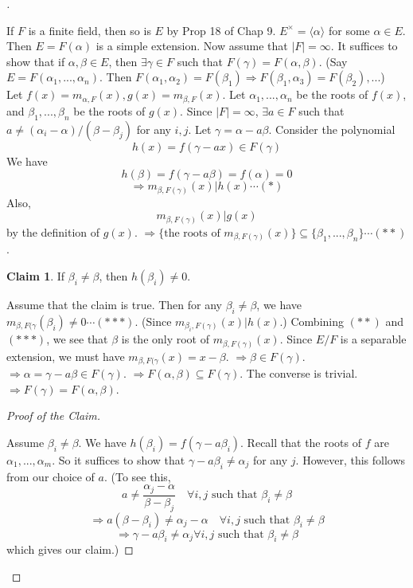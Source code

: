 \documentclass{article}
\theoremstyle{definition}
\newtheorem*{clm}{Claim}
\newenvironment{proofs}[1][\proofname]{%
  \begin{proof}[#1]$ $\par\nobreak\ignorespaces
}{%
  \end{proof}
}
\begin{document}
\begin{proofs}
	If $F$ is a finite field, then so is $E$ by Prop 18 of Chap 9.
	$E^\times = \langle \alpha \rangle$ for some $\alpha \in E$.
	Then $E = F(\alpha)$ is a simple extension.
	Now assume that $|F| = \infty$.
	It suffices to show that if $\alpha, \beta \in E$, then $\exists \gamma \in F$ such that $F(\gamma) = F(\alpha, \beta)$.
	(Say $E = F(\alpha_1, ..., \alpha_n)$.
	Then $F(\alpha_1, \alpha_2) = F(\beta_1) \Rightarrow F(\beta_1, \alpha_3) = F(\beta_2), ...$)\\
	Let $f(x) = m_{\alpha, F}(x), g(x) = m_{\beta, F}(x)$.
	Let $\alpha_1, ..., \alpha_n$ be the roots of $f(x)$, and $\beta_1, ..., \beta_n$ be the roots of $g(x)$.
	Since $|F| = \infty$, $\exists a \in F$ such that $a \neq (\alpha_i - \alpha)/(\beta - \beta_j)$ for any $i, j$.
	Let $\gamma = \alpha - a \beta$.
	Consider the polynomial
	\[
		h(x) = f(\gamma - ax) \in F(\gamma)
	\]
	We have
	\[
		h(\beta) = f(\gamma - a \beta) = f(\alpha) = 0
	\]
	\[
		\Rightarrow m_{\beta, F(\gamma)}(x) | h(x) \cdots (*)
	\]
	Also, 
	\[
		m_{\beta, F(\gamma)}(x) | g(x)
	\]
	by the definition of $g(x)$.
	$\Rightarrow \{\text{the roots of }m_{\beta, F(\gamma)}(x)\} \subseteq \{\beta_1, ..., \beta_n\} \cdots (**)$.
	\begin{clm}
		If $\beta_i \neq \beta$, then $h(\beta_i) \neq 0$.
	\end{clm}
	Assume that the claim is true.
	Then for any $\beta_i \neq \beta$, we have $m_{\beta, F(\gamma}(\beta_i) \neq 0 \cdots (***)$.
	(Since $m_{\beta_i, F(\gamma)}(x) | h(x)$.)
	Combining $(**)$ and $(***)$, we see that $\beta$ is the only root of $m_{\beta, F(\gamma)}(x)$. 
	Since $E/F$ is a separable extension, we must have $m_{\beta, F(\gamma}(x) = x - \beta$.
	$\Rightarrow \beta \in F(\gamma)$.
	$\Rightarrow \alpha = \gamma - a \beta \in F(\gamma)$.
	$\Rightarrow F(\alpha, \beta) \subseteq F(\gamma)$.
	The converse is trivial.
	$\Rightarrow F(\gamma) = F(\alpha, \beta)$.
	\begin{proofs}[Proof of the Claim]
		Assume $\beta_i \neq \beta$.
		We have $h(\beta_i) = f(\gamma - a \beta_i)$.
		Recall that the roots of $f$ are $\alpha_1, ..., \alpha_m$.
		So it suffices to show that $\gamma - a \beta_i \neq \alpha_j$ for any $j$.
		However, this follows from our choice of $a$.
		(To see this, 
		\[
			a \neq \frac{\alpha_j - \alpha}{\beta - \beta_j} \quad \forall i, j \text{ such that } \beta_i \neq \beta
		\]
		\[
			\Rightarrow a(\beta - \beta_i) \neq \alpha_j - \alpha \quad \forall i, j \text{ such that } \beta_i \neq \beta
		\]
		\[
			\Rightarrow \gamma - a \beta_i \neq \alpha_j \forall i, j \text{ such that } \beta_i \neq \beta
		\]
		which gives our claim.)
	\end{proofs}
\end{proofs}
\end{document}
